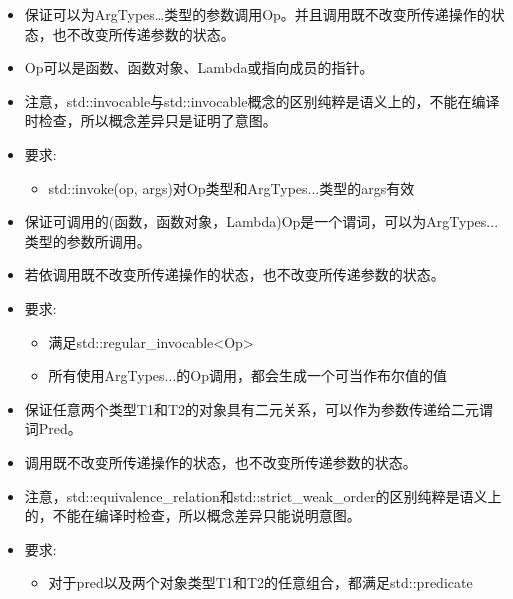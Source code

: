 
\begin{itemize}
\item
保证可以为ArgTypes…类型的参数调用Op。并且调用既不改变所传递操作的状态，也不改变所传递参数的状态。

\item
Op可以是函数、函数对象、Lambda或指向成员的指针。

\item
注意，std::invocable与std::invocable概念的区别纯粹是语义上的，不能在编译时检查，所以概念差异只是证明了意图。

\item
要求:
\begin{itemize}
\item
std::invoke(op, args)对Op类型和ArgTypes...类型的args有效
\end{itemize}
\end{itemize}


\begin{itemize}
\item
保证可调用的(函数，函数对象，Lambda)Op是一个谓词，可以为ArgTypes...类型的参数所调用。

\item
若依调用既不改变所传递操作的状态，也不改变所传递参数的状态。

\item
要求:
\begin{itemize}
\item
满足std::regular\_invocable<Op>

\item
所有使用ArgTypes...的Op调用，都会生成一个可当作布尔值的值
\end{itemize}
\end{itemize}


\begin{itemize}
\item
保证任意两个类型T1和T2的对象具有二元关系，可以作为参数传递给二元谓词Pred。

\item
调用既不改变所传递操作的状态，也不改变所传递参数的状态。

\item
注意，std::equivalence\_relation和std::strict\_weak\_order的区别纯粹是语义上的，不能在编译时检查，所以概念差异只能说明意图。

\item
要求:
\begin{itemize}
\item
对于pred以及两个对象类型T1和T2的任意组合，都满足std::predicate
\end{itemize}
\end{itemize}

